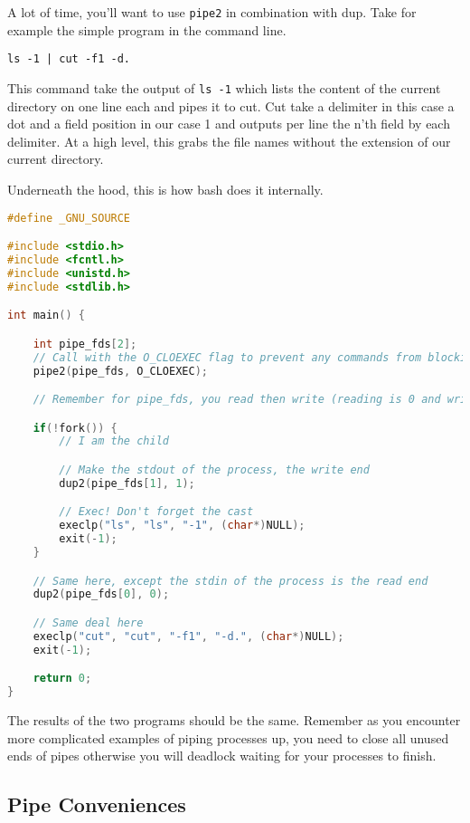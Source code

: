 A lot of time, you'll want to use \texttt{pipe2} in combination with dup. Take for example the simple program in the command line.

\begin{verbatim}
ls -1 | cut -f1 -d.
\end{verbatim}

This command take the output of \texttt{ls -1} which lists the content of the current directory on one line each and pipes it to cut.
Cut take a delimiter in this case a dot and a field position in our case 1 and outputs per line the n'th field by each delimiter.
At a high level, this grabs the file names without the extension of our current directory.

Underneath the hood, this is how bash does it internally.


\begin{lstlisting}[language=C]
#define _GNU_SOURCE

#include <stdio.h>
#include <fcntl.h>
#include <unistd.h>
#include <stdlib.h>

int main() {

    int pipe_fds[2];
    // Call with the O_CLOEXEC flag to prevent any commands from blocking
    pipe2(pipe_fds, O_CLOEXEC);

    // Remember for pipe_fds, you read then write (reading is 0 and writing is 1)

    if(!fork()) {
        // I am the child

        // Make the stdout of the process, the write end
        dup2(pipe_fds[1], 1);

        // Exec! Don't forget the cast
        execlp("ls", "ls", "-1", (char*)NULL);
        exit(-1);
    }

    // Same here, except the stdin of the process is the read end
    dup2(pipe_fds[0], 0);

    // Same deal here
    execlp("cut", "cut", "-f1", "-d.", (char*)NULL);
    exit(-1);

    return 0;
}
\end{lstlisting}

The results of the two programs should be the same. Remember as you encounter more complicated examples of piping processes up, you need to close all unused ends of pipes otherwise you will deadlock waiting for your processes to finish.

\subsection{Pipe Conveniences}

